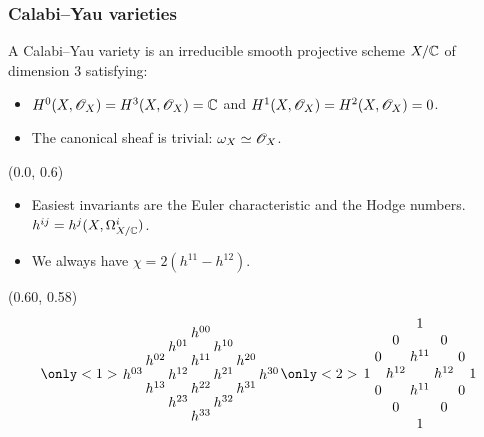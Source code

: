 \begin{frame}
\frametitle{Calabi--Yau varieties}

\begin{definition}
A Calabi--Yau variety is an irreducible smooth projective scheme $X/\mathbb{C}$ of dimension $3$ satisfying:
\begin{itemize}
	\item $H^0(X,\mathscr{O}_X)=H^3(X,\mathscr{O}_X)=\mathbb{C}$ and $H^1(X,\mathscr{O}_X)=H^2(X,\mathscr{O}_X)=0$.
	\item The canonical sheaf is trivial: $\omega_X \simeq \mathscr{O}_X$. 
\end{itemize}
\end{definition}

\begin{textblock}{0.5}(0.0, 0.6)
\begin{itemize}
	\item Easiest invariants are the Euler characteristic and the Hodge numbers. $h^{ij}=h^j(X,\Omega_{X/\mathbb{C}}^i)$.

	\item We always have $\chi = 2(h^{11}-h^{12})$. 
\end{itemize}
\end{textblock}

    \begin{textblock}{0.4}(0.60, 0.58)
    \[
    \only<1>{
   \arraycolsep=1pt\def\arraystretch{0.5}
\begin{array}[c]{ccccccc}
&&&               h^{00} \\  
 &         & h^{01} & & h^{10}  \\
&	h^{02} && h^{11}  && h^{20}  \\
   h^{03} && h^{12} && h^{21} && h^{30} \\
&	h^{13} && h^{22}  && h^{31}  \\
 &         & h^{23} & & h^{32}  \\
                &&& h^{33} 
\end{array}
}
\only<2>{
\arraycolsep=1.5pt\def\arraystretch{1}
\begin{array}[c]{ccccccc}
&&& 1 \\  
 &         & 0 & & 0  \\
&	0 && h^{11}  && 0  \\
1 && h^{12} && h^{12} && 1 \\
&	0 && h^{11}  && 0  \\
 &         & 0 & & 0  \\
 &&& 1 
\end{array}
}
\]

\end{textblock}
\end{frame}


